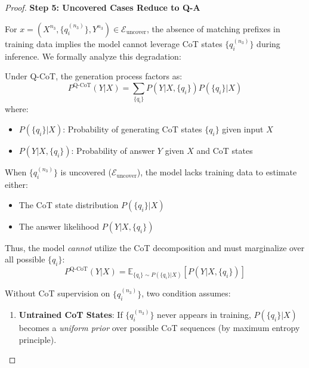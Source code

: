 \begin{proof}
\vspace{0.5em}

\noindent \textbf{Step 5: Uncovered Cases Reduce to Q-A}

For $x = (X^{n_3}, \{q_i^{(n_3)}\}, Y^{n_3}) \in \mathcal{E}_{\text{uncover}}$, the absence of matching prefixes in training data implies the model cannot leverage CoT states $\{q_i^{(n_3)}\}$ during inference. We formally analyze this degradation:



Under Q-CoT, the generation process factors as:
\[
P^{\text{Q-CoT}}(Y|X) = \sum_{\{q_i\}} P(Y|X, \{q_i\}) P(\{q_i\}|X)
\]
where:
\begin{itemize}
    \item $P(\{q_i\}|X)$: Probability of generating CoT states $\{q_i\}$ given input $X$
    \item $P(Y|X, \{q_i\})$: Probability of answer $Y$ given $X$ and CoT states
\end{itemize}



When $\{q_i^{(n_3)}\}$ is uncovered ($\mathcal{E}_{\text{uncover}}$), the model lacks training data to estimate either:
\begin{itemize}
    \item The CoT state distribution $P(\{q_i\}|X)$
    \item The answer likelihood $P(Y|X, \{q_i\})$ 
\end{itemize}

Thus, the model \textit{cannot} utilize the CoT decomposition and must marginalize over all possible $\{q_i\}$:
\[
P^{\text{Q-CoT}}(Y|X) = \mathbb{E}_{\{q_i\} \sim P(\{q_i\}|X)} \left[ P(Y|X, \{q_i\}) \right]
\]



Without CoT supervision on $\{q_i^{(n_3)}\}$, two condition assumes:
\begin{enumerate}
    \item \textbf{Untrained CoT States}: If $\{q_i^{(n_3)}\}$ never appears in training, $P(\{q_i\}|X)$ becomes a \textit{uniform prior} over possible CoT sequences (by maximum entropy principle).
    

\end{enumerate}
\end{proof}
